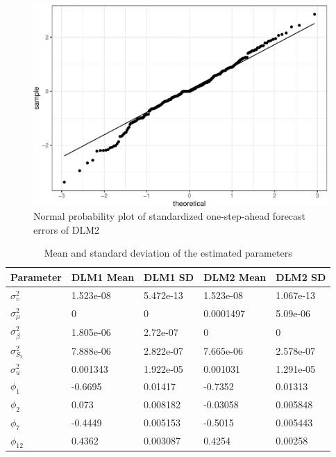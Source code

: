 \documentclass[]{article}
\begin{document}
\begin{figure}
\centering
\includegraphics{../figs/freq--qqnorm-1.pdf}
\caption{\label{fig:qqnorm}Normal probability plot of standardized
one-step-ahead forecast errors of DLM2}
\end{figure}

\begin{table}[t]

\caption{\label{tab:par-comparison}Mean and standard deviation of the estimated parameters}
\centering
\begin{tabular}{lllll}
\toprule
Parameter & DLM1 Mean & DLM1 SD & DLM2 Mean & DLM2 SD\\
\midrule
$\sigma_{v}^{2}$ & 1.523e-08 & 5.472e-13 & 1.523e-08 & 1.067e-13\\
$\sigma_{\mu}^{2}$ & 0 & 0 & 0.0001497 & 5.09e-06\\
$\sigma_{\beta}^{2}$ & 1.805e-06 & 2.72e-07 & 0 & 0\\
$\sigma_{S_{2}}^{2}$ & 7.888e-06 & 2.822e-07 & 7.665e-06 & 2.578e-07\\
$\sigma^{2}_{u}$ & 0.001343 & 1.922e-05 & 0.001031 & 1.291e-05\\
\addlinespace
$\phi_{1}$ & -0.6695 & 0.01417 & -0.7352 & 0.01313\\
$\phi_{2}$ & 0.073 & 0.008182 & -0.03058 & 0.005848\\
$\phi_{7}$ & -0.4449 & 0.005153 & -0.5015 & 0.005443\\
$\phi_{12}$ & 0.4362 & 0.003087 & 0.4254 & 0.00258\\
\bottomrule
\end{tabular}
\end{table}
\end{document}
